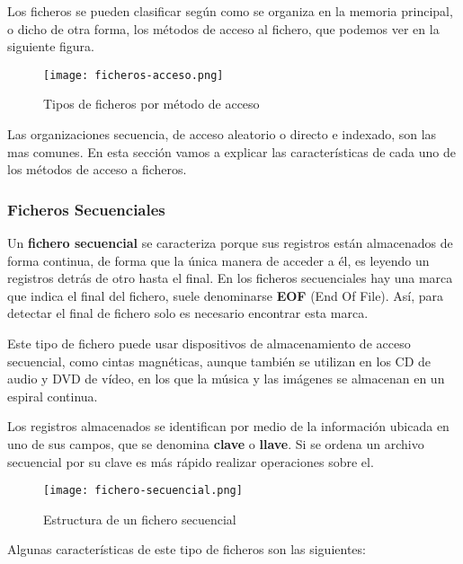 Los ficheros se pueden clasificar según como se organiza en la memoria principal, o dicho de otra forma, los métodos de acceso al fichero, que podemos ver en la siguiente figura.

\begin{figure}[ht]
    \centering
    \texttt{[image: ficheros-acceso.png]}
    \caption{Tipos de ficheros por método de acceso}
\end{figure}

Las organizaciones secuencia, de acceso aleatorio o directo e indexado, son las mas comunes. En esta sección vamos a explicar las características de cada uno de los métodos de acceso a ficheros.

\subsubsection{Ficheros Secuenciales}
Un \textbf{fichero secuencial} se caracteriza porque sus registros están almacenados de forma continua, de forma que la única manera de acceder a él, es leyendo un registros detrás de otro hasta el final. En los ficheros secuenciales hay una marca que indica el final del fichero, suele denominarse \textbf{EOF} (End Of File). Así, para detectar el final de fichero solo es necesario encontrar esta marca.

Este tipo de fichero puede usar dispositivos de almacenamiento de acceso secuencial, como cintas magnéticas, aunque también se utilizan en los CD de audio y DVD de vídeo, en los que la música y las imágenes se almacenan en un espiral continua.

Los registros almacenados se identifican por medio de la información ubicada en uno de sus campos, que se denomina \textbf{clave} o \textbf{llave}. Si se ordena un archivo secuencial por su clave es más rápido realizar operaciones sobre el.

\begin{figure}[ht]
    \centering
    \texttt{[image: fichero-secuencial.png]}
    \caption{Estructura de un fichero secuencial}
\end{figure}

Algunas características de este tipo de ficheros son las siguientes:

